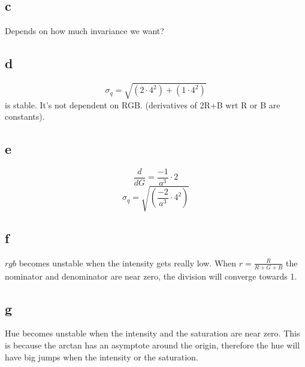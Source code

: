 \documentclass[a4paper,11pt]{article}
\begin{document}
		\subsection*{c}
			Depends on how much invariance we want?

		\subsection*{d}
			\[\sigma_q = \sqrt{(2\cdot4^2)+(1\cdot4^2)}\] 
			is stable. It's not dependent on RGB. (derivatives of 2R+B wrt R or B are constants).
		\subsection*{e}
			\[\frac{d}{dG}=\frac{-1}{a^3}\cdot 2\]
			\[\sigma_q = \sqrt{(\frac{-2}{a^3}\cdot4^2)}\] 
		\subsection*{f}
			$rgb$ becomes unstable when the intensity gets really low. When $r=\frac{R}{R+G+B}$
			the nominator and denominator are near zero, the division will converge towards 1.
		\subsection*{g}
			Hue becomes unstable when the intensity and the saturation are near zero. This is
			because the arctan has an asymptote around the origin, therefore the hue will have
			big jumps when the intensity or the saturation.
\end{document}
